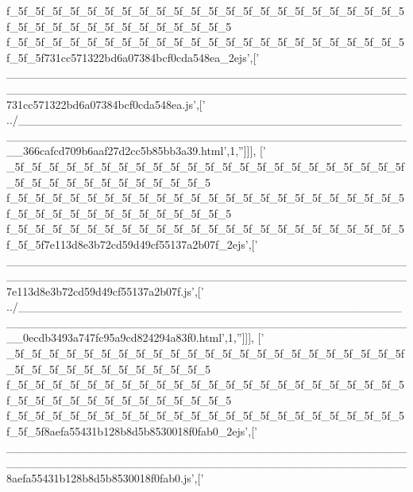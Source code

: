 \begin{DoxyCode}
{      f\_5f\_5f\_5f\_5f\_5f\_5f\_5f\_5f\_5f\_5f\_5f\_5f\_5f\_5f\_5f\_5f\_5f\_5f\_5f\_5f\_5f\_5f\_5f\_5f\_5f\_5f\_5f\_5f\_5f\_5f\_5f\_5f\_5f\_5f\_5f\_5
      f\_5f\_5f\_5f\_5f\_5f\_5f\_5f\_5f\_5f\_5f\_5f\_5f\_5f\_5f\_5f\_5f\_5f\_5f\_5f\_5f\_5f\_5f\_5f\_5f\_5f731cc571322bd6a07384bcf0cda548ea\_2ejs'},[\textcolor{stringliteral}{'
      \_\_\_\_\_\_\_\_\_\_\_\_\_\_\_\_\_\_\_\_\_\_\_\_\_\_\_\_\_\_\_\_\_\_\_\_\_\_\_\_\_\_\_\_\_\_\_\_\_\_\_\_\_\_\_\_\_\_\_\_\_\_\_\_\_\_\_\_\_\_\_\_\_\_\_\_\_\_\_\_\_\_\_\_\_\_\_\_\_\_\_\_\_\_\_\_731cc571322bd6a07384bcf0cda548ea.js'},[\textcolor{stringliteral}{'
      ../\_\_\_\_\_\_\_\_\_\_\_\_\_\_\_\_\_\_\_\_\_\_\_\_\_\_\_\_\_\_\_\_\_\_\_\_\_\_\_\_\_\_\_\_\_\_\_\_\_\_\_\_\_\_\_\_\_\_\_\_\_\_\_\_\_\_\_\_\_\_\_\_\_\_\_\_\_\_\_\_\_\_\_\_\_\_\_\_\_\_\_\_\_\_\_\_366cafcd709b6aaf27d2cc5b85bb3a39.html'},1,\textcolor{stringliteral}{''}]]],
  [\textcolor{stringliteral}{'
      \_5f\_5f\_5f\_5f\_5f\_5f\_5f\_5f\_5f\_5f\_5f\_5f\_5f\_5f\_5f\_5f\_5f\_5f\_5f\_5f\_5f\_5f\_5f\_5f\_5f\_5f\_5f\_5f\_5f\_5f\_5f\_5f\_5f\_5f\_5
      f\_5f\_5f\_5f\_5f\_5f\_5f\_5f\_5f\_5f\_5f\_5f\_5f\_5f\_5f\_5f\_5f\_5f\_5f\_5f\_5f\_5f\_5f\_5f\_5f\_5f\_5f\_5f\_5f\_5f\_5f\_5f\_5f\_5f\_5f\_5f\_5
      f\_5f\_5f\_5f\_5f\_5f\_5f\_5f\_5f\_5f\_5f\_5f\_5f\_5f\_5f\_5f\_5f\_5f\_5f\_5f\_5f\_5f\_5f\_5f\_5f\_5f7e113d8e3b72cd59d49cf55137a2b07f\_2ejs'},[\textcolor{stringliteral}{'
      \_\_\_\_\_\_\_\_\_\_\_\_\_\_\_\_\_\_\_\_\_\_\_\_\_\_\_\_\_\_\_\_\_\_\_\_\_\_\_\_\_\_\_\_\_\_\_\_\_\_\_\_\_\_\_\_\_\_\_\_\_\_\_\_\_\_\_\_\_\_\_\_\_\_\_\_\_\_\_\_\_\_\_\_\_\_\_\_\_\_\_\_\_\_\_\_7e113d8e3b72cd59d49cf55137a2b07f.js'},[\textcolor{stringliteral}{'
      ../\_\_\_\_\_\_\_\_\_\_\_\_\_\_\_\_\_\_\_\_\_\_\_\_\_\_\_\_\_\_\_\_\_\_\_\_\_\_\_\_\_\_\_\_\_\_\_\_\_\_\_\_\_\_\_\_\_\_\_\_\_\_\_\_\_\_\_\_\_\_\_\_\_\_\_\_\_\_\_\_\_\_\_\_\_\_\_\_\_\_\_\_\_\_\_\_0ecdb3493a747fc95a9cd824294a83f0.html'},1,\textcolor{stringliteral}{''}]]],
  [\textcolor{stringliteral}{'
      \_5f\_5f\_5f\_5f\_5f\_5f\_5f\_5f\_5f\_5f\_5f\_5f\_5f\_5f\_5f\_5f\_5f\_5f\_5f\_5f\_5f\_5f\_5f\_5f\_5f\_5f\_5f\_5f\_5f\_5f\_5f\_5f\_5f\_5f\_5
      f\_5f\_5f\_5f\_5f\_5f\_5f\_5f\_5f\_5f\_5f\_5f\_5f\_5f\_5f\_5f\_5f\_5f\_5f\_5f\_5f\_5f\_5f\_5f\_5f\_5f\_5f\_5f\_5f\_5f\_5f\_5f\_5f\_5f\_5f\_5f\_5
      f\_5f\_5f\_5f\_5f\_5f\_5f\_5f\_5f\_5f\_5f\_5f\_5f\_5f\_5f\_5f\_5f\_5f\_5f\_5f\_5f\_5f\_5f\_5f\_5f\_5f8aefa55431b128b8d5b8530018f0fab0\_2ejs'},[\textcolor{stringliteral}{'
      \_\_\_\_\_\_\_\_\_\_\_\_\_\_\_\_\_\_\_\_\_\_\_\_\_\_\_\_\_\_\_\_\_\_\_\_\_\_\_\_\_\_\_\_\_\_\_\_\_\_\_\_\_\_\_\_\_\_\_\_\_\_\_\_\_\_\_\_\_\_\_\_\_\_\_\_\_\_\_\_\_\_\_\_\_\_\_\_\_\_\_\_\_\_\_\_8aefa55431b128b8d5b8530018f0fab0.js'},[\textcolor{stringliteral}{'
}
\end{DoxyCode}
